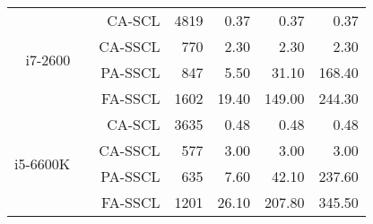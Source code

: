 \begin{table}[htp]
\begin{tabular}{r r r r r r r}
    \hline
    \multirow{4}{*}{i7-2600}         & \multirow{4}{*}{\cite{Leonardon2019}} & CA-SCL                            &  4819                             &  0.37           &   0.37          &   0.37          \\
                                     &                                       & CA-SSCL                           &   770                             &  2.30           &   2.30          &   2.30          \\
                                     &                                       & PA-SSCL                           &   847                             &  5.50           &  31.10          & 168.40          \\
                                     &                                       & FA-SSCL                           &  1602                             & 19.40           & 149.00          & 244.30          \\
    \hline
    \multirow{4}{*}{i5-6600K}        & \multirow{4}{*}{\cite{Leonardon2019}} & CA-SCL                            &  3635                             &  0.48           &   0.48          &   0.48          \\
                                     &                                       & CA-SSCL                           &   577                             &  3.00           &   3.00          &   3.00          \\
                                     &                                       & PA-SSCL                           &   635                             &  7.60           &  42.10          & 237.60          \\
                                     &                                       & FA-SSCL                           &  1201                             & 26.10           & 207.80          & 345.50          \\
  \end{tabular}
\end{table}


